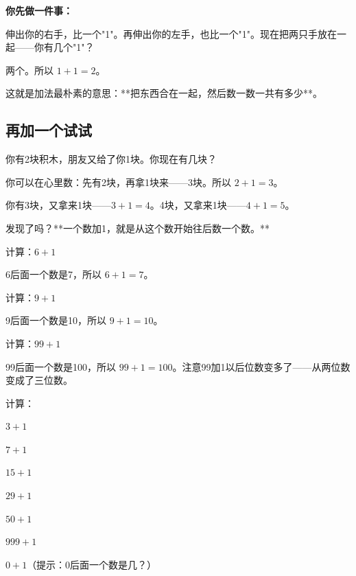 

\textbf{你先做一件事：}

伸出你的右手，比一个"1"。再伸出你的左手，也比一个"1"。现在把两只手放在一起——你有几个"1"？

两个。所以 $1+1=2$。

这就是加法最朴素的意思：**把东西合在一起，然后数一数一共有多少**。

\subsection*{再加一个试试}

你有2块积木，朋友又给了你1块。你现在有几块？

你可以在心里数：先有2块，再拿1块来——3块。所以 $2+1=3$。

你有3块，又拿来1块——$3+1=4$。4块，又拿来1块——$4+1=5$。

发现了吗？**一个数加1，就是从这个数开始往后数一个数。**

\begin{example}
计算：$6+1$
\end{example}
\begin{solution}
6后面一个数是7，所以 $6+1=7$。
\end{solution}

\begin{example}
计算：$9+1$
\end{example}
\begin{solution}
9后面一个数是10，所以 $9+1=10$。
\end{solution}

\begin{example}
计算：$99+1$
\end{example}
\begin{solution}
99后面一个数是100，所以 $99+1=100$。注意99加1以后位数变多了——从两位数变成了三位数。
\end{solution}

\begin{exercise}
\item 计算：
  \begin{subexercise}
    \item $3+1$
    \item $7+1$
    \item $15+1$
    \item $29+1$
    \item $50+1$
    \item $999+1$
    \item $0+1$（提示：0后面一个数是几？）
  \end{subexercise}
\end{exercise}

